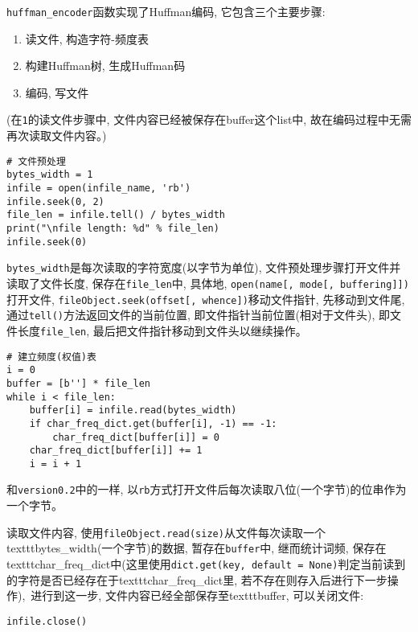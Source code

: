 \documentclass[a4paper]{ctexart}
\begin{document}
\texttt{huffman\_encoder}函数实现了Huffman编码, 它包含三个主要步骤:

\begin{enumerate}
\def\labelenumi{\arabic{enumi}.}
\item
  读文件, 构造字符-频度表
\item
  构建Huffman树, 生成Huffman码
\item
  编码, 写文件
\end{enumerate}

(在\texttt{1}的读文件步骤中, 文件内容已经被保存在buffer这个list中, 故在编码过程中无需再次读取文件内容。)

{\setmainfont{Courier New Bold}              
\begin{lstlisting}
# 文件预处理
bytes_width = 1
infile = open(infile_name, 'rb')
infile.seek(0, 2)
file_len = infile.tell() / bytes_width
print("\nfile length: %d" % file_len)
infile.seek(0)
\end{lstlisting}}

\texttt{bytes\_width}是每次读取的字符宽度(以字节为单位), 文件预处理步骤打开文件并读取了文件长度, 保存在\texttt{file\_len}中, 具体地, \texttt{open(name{[},\ mode{[},\ buffering{]}{]})}打开文件, \texttt{fileObject.seek(offset{[},\ whence{]})}移动文件指针, 先移动到文件尾, 通过\texttt{tell()}方法返回文件的当前位置, 即文件指针当前位置(相对于文件头), 即文件长度\texttt{file\_len}, 最后把文件指针移动到文件头以继续操作。

{\setmainfont{Courier New Bold}              
\begin{lstlisting}
# 建立频度(权值)表
i = 0
buffer = [b''] * file_len
while i < file_len:
    buffer[i] = infile.read(bytes_width)
    if char_freq_dict.get(buffer[i], -1) == -1:
        char_freq_dict[buffer[i]] = 0
    char_freq_dict[buffer[i]] += 1
    i = i + 1
\end{lstlisting}}

和\texttt{version0.2}中的一样, 以\texttt{rb}方式打开文件后每次读取八位(一个字节)的位串作为一个字节。

读取文件内容, 使用\texttt{fileObject.read(size)}从文件每次读取一个texttt{bytes\_width}(一个字节)的数据,
暂存在\texttt{buffer}中, 继而统计词频, 保存在texttt{char\_freq\_dict}中(这里使用\texttt{dict.get(key,\ default\ =\ None)}判定当前读到的字符是否已经存在于texttt{char\_freq\_dict}里, 若不存在则存入后进行下一步操作),\ 进行到这一步, 文件内容已经全部保存至texttt{buffer}, 可以关闭文件:

{\setmainfont{Courier New Bold}              
\begin{lstlisting}
infile.close()
\end{lstlisting}}
\end{document}
